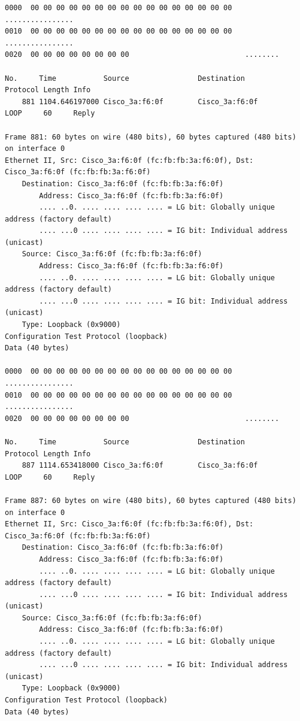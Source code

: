 \documentclass[a4paper,11pt]{article}
\begin{document}
\begin{lstlisting}
0000  00 00 00 00 00 00 00 00 00 00 00 00 00 00 00 00   ................
0010  00 00 00 00 00 00 00 00 00 00 00 00 00 00 00 00   ................
0020  00 00 00 00 00 00 00 00                           ........

No.     Time           Source                Destination           Protocol Length Info
    881 1104.646197000 Cisco_3a:f6:0f        Cisco_3a:f6:0f        LOOP     60     Reply

Frame 881: 60 bytes on wire (480 bits), 60 bytes captured (480 bits) on interface 0
Ethernet II, Src: Cisco_3a:f6:0f (fc:fb:fb:3a:f6:0f), Dst: Cisco_3a:f6:0f (fc:fb:fb:3a:f6:0f)
    Destination: Cisco_3a:f6:0f (fc:fb:fb:3a:f6:0f)
        Address: Cisco_3a:f6:0f (fc:fb:fb:3a:f6:0f)
        .... ..0. .... .... .... .... = LG bit: Globally unique address (factory default)
        .... ...0 .... .... .... .... = IG bit: Individual address (unicast)
    Source: Cisco_3a:f6:0f (fc:fb:fb:3a:f6:0f)
        Address: Cisco_3a:f6:0f (fc:fb:fb:3a:f6:0f)
        .... ..0. .... .... .... .... = LG bit: Globally unique address (factory default)
        .... ...0 .... .... .... .... = IG bit: Individual address (unicast)
    Type: Loopback (0x9000)
Configuration Test Protocol (loopback)
Data (40 bytes)

0000  00 00 00 00 00 00 00 00 00 00 00 00 00 00 00 00   ................
0010  00 00 00 00 00 00 00 00 00 00 00 00 00 00 00 00   ................
0020  00 00 00 00 00 00 00 00                           ........

No.     Time           Source                Destination           Protocol Length Info
    887 1114.653418000 Cisco_3a:f6:0f        Cisco_3a:f6:0f        LOOP     60     Reply

Frame 887: 60 bytes on wire (480 bits), 60 bytes captured (480 bits) on interface 0
Ethernet II, Src: Cisco_3a:f6:0f (fc:fb:fb:3a:f6:0f), Dst: Cisco_3a:f6:0f (fc:fb:fb:3a:f6:0f)
    Destination: Cisco_3a:f6:0f (fc:fb:fb:3a:f6:0f)
        Address: Cisco_3a:f6:0f (fc:fb:fb:3a:f6:0f)
        .... ..0. .... .... .... .... = LG bit: Globally unique address (factory default)
        .... ...0 .... .... .... .... = IG bit: Individual address (unicast)
    Source: Cisco_3a:f6:0f (fc:fb:fb:3a:f6:0f)
        Address: Cisco_3a:f6:0f (fc:fb:fb:3a:f6:0f)
        .... ..0. .... .... .... .... = LG bit: Globally unique address (factory default)
        .... ...0 .... .... .... .... = IG bit: Individual address (unicast)
    Type: Loopback (0x9000)
Configuration Test Protocol (loopback)
Data (40 bytes)


\end{lstlisting}
\end{document}
